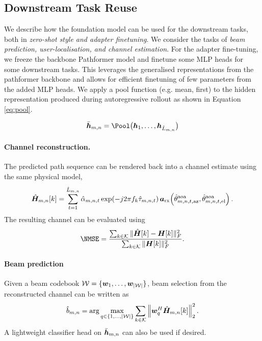 \subsection{Downstream Task Reuse}\label{sec:down}
We describe how the foundation model can be used for the downstream tasks, both in \emph{zero-shot style and adapter finetuning}. We consider the tasks of \textit{beam prediction, user-localisation, and channel estimation}. 
For the adapter fine-tuning, we freeze the backbone Pathformer model and finetune some MLP heads for some downstream tasks. This leverages the generalised representations from the pathformer backbone and allows for efficient finetuning of few parameters from the added MLP heads. We apply a pool function (e.g. mean, first) to the hidden representation produced during autoregressive rollout as shown in Equation \ref{eq:pool}. 

\begin{equation}
\bar{\vect{h}}_{m,n} = \Pool\big(\vect{h}_1,\ldots,\vect{h}_{\hat{L}_{m,n}}\big)
\label{eq:pool}
\end{equation}


\paragraph{Channel reconstruction.}
The predicted path sequence can be rendered back into a channel estimate using the same physical model,
\begin{equation}
\hat{\boldsymbol{H}}_{m,n}[k]
=
\sum_{t=1}^{\hat{L}_{m,n}}
\hat{\alpha}_{m,n,t}
\exp\!\left(-j2\pi f_k\hat{\tau}_{m,n,t}\right)
\boldsymbol{a}_{\mathrm{rx}}\!\left(\hat{\theta}^{\mathrm{aoa}}_{m,n,t,\mathrm{az}},\hat{\theta}^{\mathrm{aoa}}_{m,n,t,\mathrm{el}}\right).
\label{eq:channel_reconstruction}
\end{equation}
The resulting channel can be evaluated using
\begin{equation}
\NMSE
=
\frac{\sum_{k \in \cK}\|\hat{\vect{H}}[k]-\vect{H}[k]\|_F^2}
{\sum_{k \in \cK}\|\vect{H}[k]\|_F^2}.
\label{eq:nmse}
\end{equation}

\paragraph{Beam prediction}
Given a beam codebook $\mathcal{W}=\{\boldsymbol{w}_1,\ldots,\boldsymbol{w}_{|\mathcal{W}|}\}$, beam selection from the reconstructed channel can be written as
\begin{equation}
\hat{b}_{m,n}
=
\arg\max_{q \in \{1,\ldots,|\mathcal{W}|\}}
\sum_{k \in \mathcal{K}}
\left\|\boldsymbol{w}_q^{H}\hat{\boldsymbol{H}}_{m,n}[k]\right\|_2^2.
\label{eq:beam_selection}
\end{equation}
A lightweight classifier head on $\bar{\boldsymbol{h}}_{m,n}$ can also be used if desired.

